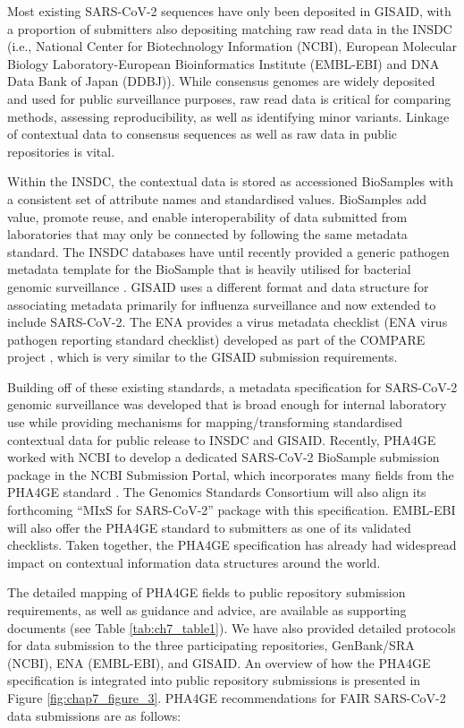 Most existing SARS-CoV-2 sequences have only been deposited in GISAID, with a proportion of submitters also depositing matching raw read data in the INSDC (i.e., National Center for Biotechnology Information (NCBI), European Molecular Biology Laboratory-European Bioinformatics Institute (EMBL-EBI) and DNA Data Bank of Japan (DDBJ)). While consensus genomes are widely deposited and used for public surveillance purposes, raw read data is critical for comparing methods, assessing reproducibility, as well as identifying minor variants. Linkage of contextual data to consensus sequences as well as raw data in public repositories is vital. 

Within the INSDC, the contextual data is stored as accessioned BioSamples \cite{barrett_bioproject_2012} with a consistent set of attribute names and standardised values. BioSamples add value, promote reuse, and enable interoperability of data submitted from laboratories that may only be connected by following the same metadata standard. The INSDC databases have until recently provided a generic pathogen metadata template for the BioSample that is heavily utilised for bacterial genomic surveillance \cite{noauthor_home_nodate}. GISAID uses a different format and data structure for associating metadata primarily for influenza surveillance and now extended to include SARS-CoV-2. The ENA provides a virus metadata checklist (ENA virus pathogen reporting standard checklist) developed as part of the COMPARE project \cite{compare_home_nodate}, which is very similar to the GISAID submission requirements.

Building off of these existing standards, a metadata specification for SARS-CoV-2 genomic surveillance was developed that is broad enough for internal laboratory use while providing mechanisms for mapping/transforming standardised contextual data for public release to INSDC and GISAID. Recently, PHA4GE worked with NCBI to develop a dedicated SARS-CoV-2 BioSample submission package in the NCBI Submission Portal, which incorporates many fields from the PHA4GE standard \cite{staff_dedicated_2021}. The Genomics Standards Consortium will also align its forthcoming “MIxS for SARS-CoV-2” package with this specification. EMBL-EBI will also offer the PHA4GE standard to submitters as one of its validated checklists. Taken together, the PHA4GE specification has already had widespread impact on contextual information data structures around the world.

The detailed mapping of PHA4GE fields to public repository submission requirements, as well as guidance and advice, are available as supporting documents (see Table \ref{tab:ch7_table1}). We have also provided detailed protocols for data submission to the three participating repositories, GenBank/SRA (NCBI), ENA (EMBL-EBI), and GISAID. An overview of how the PHA4GE specification is integrated into public repository submissions is presented in Figure \ref{fig:chap7_figure_3}. PHA4GE recommendations for FAIR SARS-CoV-2 data submissions are as follows:

